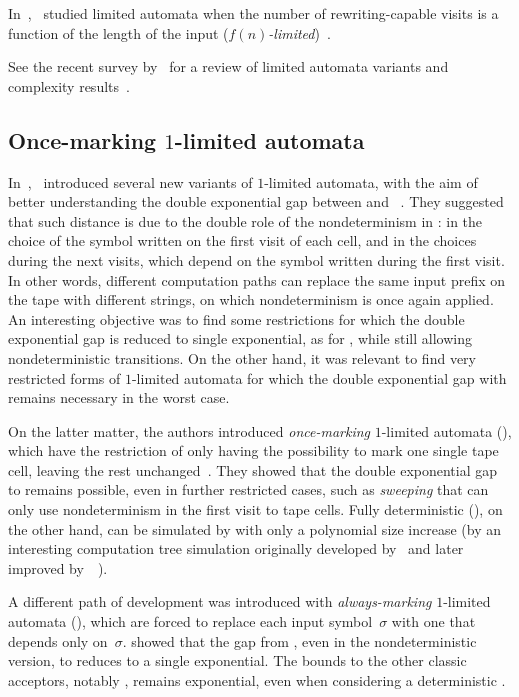 In~\citeyear{WecBra79},~\citeauthor{WecBra79} studied limited automata when the number of rewriting-capable visits is a function of the length of the input (\emph{$f(n)$-limited})~\cite{WecBra79}.

See the recent survey by~\citeauthor{Pig19} for a review of limited automata variants and complexity results~\cite{Pig19}.


\subsection{Once-marking \texorpdfstring{$1$}{1}-limited automata}
In~\citeyear{PigPri23a},~\citeauthor{PigPri23a} introduced several new variants of $1$-limited automata, with the aim of better understanding the double exponential gap between \OLA and \ODFA~\cite{PigPri23a,PigPri23}.
They suggested that such distance is due to the double role of the nondeterminism in \OLAs: in the choice of the symbol written on the first visit of each cell, and in the choices during the next visits, which depend on the symbol written during the first visit.
In other words, different computation paths can replace the same input prefix on the tape with different strings, on which nondeterminism is once again applied.
An interesting objective was to find some restrictions for which the double exponential gap is reduced to single exponential, as for \ODLA, while still allowing nondeterministic transitions.
On the other hand, it was relevant to find very restricted forms of $1$-limited automata for which the double exponential gap with \ODFA remains necessary in the worst case.

On the latter matter, the authors introduced \emph{once-marking} $1$-limited automata (\OMOLA), which have the restriction of only having the possibility to mark one single tape cell, leaving the rest unchanged~\cite{PigPri23}.
They showed that the double exponential gap to \ODFA remains possible, even in further restricted cases, such as \emph{sweeping} \OMOLA that can only use nondeterminism in the first visit to tape cells.
Fully deterministic \OMOLA (\OMODLA), on the other hand, can be simulated by \TDFAs with only a polynomial size increase (by an interesting computation tree simulation originally developed by~\citeauthor{Sip80a} and later improved by~\citeauthor{GefMer+07}~\cite{Sip80a,GefMer+07}).

A different path of development was introduced with \emph{always-marking} $1$-limited automata (\AMOLA), which are forced to replace each input symbol~$\sigma$ with one that depends only on~$\sigma$.
\citeauthor{PigPri23a} showed that the gap from \AMOLA, even in the nondeterministic version, to \ODFA reduces to a single exponential.
The bounds to the other classic acceptors, notably \TNFA, remains exponential, even when considering a deterministic \AMOLA.

